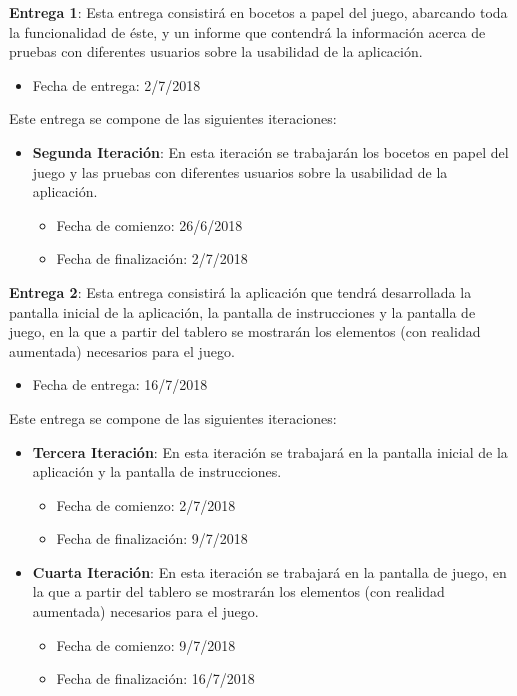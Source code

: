 \hfill

\textbf{Entrega 1}: Esta entrega consistirá en bocetos a papel del juego, abarcando toda la funcionalidad de éste, y un informe que contendrá la información acerca de pruebas con diferentes usuarios sobre la usabilidad de la aplicación.

\begin{itemize}
  \item Fecha de entrega: 2/7/2018
\end{itemize}

\hfill

Este entrega se compone de las siguientes iteraciones:

\begin{itemize}
  \item \textbf{Segunda Iteración}: En esta iteración se trabajarán los bocetos en papel del juego y las pruebas con diferentes usuarios sobre la usabilidad de la aplicación.

  \begin{itemize}
    \item Fecha de comienzo: 26/6/2018
    \item Fecha de finalización: 2/7/2018
  \end{itemize}
\end{itemize}

\hfill

\textbf{Entrega 2}: Esta entrega consistirá la aplicación que tendrá desarrollada la pantalla inicial de la aplicación, la pantalla de instrucciones y la pantalla de juego, en la que a partir del tablero se mostrarán los elementos (con realidad aumentada) necesarios para el juego.

\begin{itemize}
  \item Fecha de entrega: 16/7/2018
\end{itemize}

\hfill

Este entrega se compone de las siguientes iteraciones:

\begin{itemize}
  \item \textbf{Tercera Iteración}: En esta iteración se trabajará en la pantalla inicial de la aplicación y la pantalla de instrucciones.

  \begin{itemize}
    \item Fecha de comienzo: 2/7/2018
    \item Fecha de finalización: 9/7/2018
  \end{itemize}

  \item \textbf{Cuarta Iteración}: En esta iteración se trabajará en la pantalla de juego, en la que a partir del tablero se mostrarán los elementos (con realidad aumentada) necesarios para el juego.

  \begin{itemize}
    \item Fecha de comienzo: 9/7/2018
    \item Fecha de finalización: 16/7/2018
  \end{itemize}
\end{itemize}

